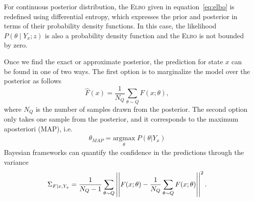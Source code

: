 \begin{rem}
  For continuous posterior distribution, the \textsc{Elbo} given in
  equation~\eqref{eq:elbo} is redefined using differential entropy, which
  expresses the prior and posterior in terms of their probability density
  functions. In this case, the likelihood $P(\theta \mid Y_x;z)$ is also
  a probability density function and the \textsc{Elbo} is not bounded by zero.
\end{rem}


Once we find the exact or approximate posterior, the prediction for state $x$
can be found in one of two ways. The first option is to marginalize the model
over the posterior as follows~\cite{jospin2020hands}
\begin{equation}
  \hat{F}(x) = \frac{1}{N_Q} \sum_{\theta \sim Q} F(x; \theta),
  \label{eqn:marginalization}
\end{equation} 
where $N_Q$ is the number of samples drawn from the posterior. 
%
The second option only takes one sample from the posterior, and it corresponds
to the maximum aposteriori (MAP), i.e. 
\begin{align} 
  \theta_{MAP}=\underset{\theta}{\textrm{argmax}}\; P(\theta | Y_x)
\end{align}
Bayesian frameworks can quantify the confidence in the
predictions through the variance~\cite{jospin2020hands}
\begin{equation}
  \Sigma_{F \mid x,Y_x} = \frac{1}{N_Q-1} \sum_{\theta \sim Q} \left|\left|F(x; \theta) - \frac{1}{N_Q} \sum_{\theta \sim Q} F(x; \theta)\right|\right|^2.
  \label{eqn:predictive_variance}
\end{equation}
%

